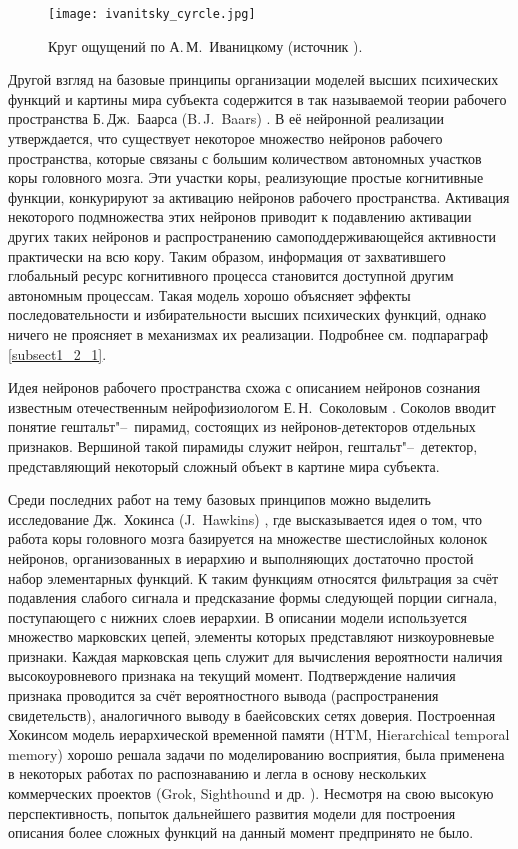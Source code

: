 \begin{figure}[h]
	\centering	
	\texttt{[image: ivanitsky\_cyrcle.jpg]}
	\caption{Круг ощущений по А.\,М.~Иваницкому (источник \cite{Ivanitsky1996}).}
	\label{fg:ivanitsky_cyrcle}
\end{figure}

Другой взгляд на базовые принципы организации моделей высших психических функций и картины мира субъекта содержится в так называемой теории рабочего пространства Б.\,Дж.~Баарса (B.\,J.~Baars) \cite{Baars2005}. В её нейронной реализации \cite{Dehaene2003} утверждается, что существует некоторое множество нейронов рабочего пространства, которые связаны с большим количеством автономных участков коры головного мозга. Эти участки коры, реализующие простые когнитивные функции, конкурируют за активацию нейронов рабочего пространства. Активация некоторого подмножества этих нейронов приводит к подавлению активации других таких нейронов и распространению самоподдерживающейся активности практически на всю кору. Таким образом, информация от захватившего глобальный ресурс когнитивного процесса становится доступной другим автономным процессам. Такая модель хорошо объясняет эффекты последовательности и избирательности высших психических функций, однако ничего не проясняет в механизмах их реализации. Подробнее см. подпараграф \ref{subsect1_2_1}.

Идея нейронов рабочего пространства схожа с описанием нейронов сознания известным отечественным нейрофизиологом Е.\,Н.~Соколовым \cite{Sokolov2004}. Соколов вводит понятие гештальт"--~пирамид, состоящих из нейронов-детекторов отдельных признаков. Вершиной такой пирамиды служит нейрон, гештальт"--~детектор, представляющий некоторый сложный объект в картине мира субъекта.

Среди последних работ на тему базовых принципов можно выделить исследование Дж.~Хокинса (J.~Hawkins) \cite{Hawkins2009}, где высказывается идея о том, что работа коры головного мозга базируется на множестве шестислойных колонок нейронов, организованных в иерархию и выполняющих достаточно простой набор элементарных функций. К таким функциям относятся фильтрация за счёт подавления слабого сигнала и предсказание формы следующей порции сигнала, поступающего с нижних слоев иерархии. В описании модели используется множество марковских цепей, элементы которых представляют низкоуровневые признаки. Каждая марковская цепь служит для вычисления вероятности наличия высокоуровневого признака на текущий момент. Подтверждение наличия признака проводится за счёт вероятностного вывода (распространения свидетельств), аналогичного выводу в баейсовских сетях доверия. Построенная Хокинсом модель иерархической временной памяти (HTM, Hierarchical temporal memory) хорошо решала задачи по моделированию восприятия, была применена в некоторых работах по распознаванию \cite{Bolotova2011} и легла в основу нескольких коммерческих проектов (Grok, Sighthound и др. \cite{NUM2014}). Несмотря на свою высокую перспективность, попыток дальнейшего развития модели для построения описания более сложных функций на данный момент предпринято не было.

